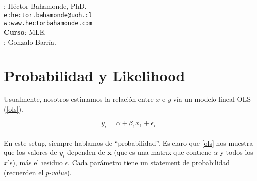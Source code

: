 \documentclass[10pt]{article}
\begin{document}


\thispagestyle{fancy} %





\hspace{-5mm}{\bf Profesor}: H\'ector Bahamonde, PhD.\\
\texttt{e:}\href{mailto:hector.bahamonde@uoh.cl}{\texttt{hector.bahamonde@uoh.cl}}\\
\texttt{w:}\href{http://www.hectorbahamonde.com}{\texttt{www.hectorbahamonde.com}}\\
{\bf Curso}: MLE.\\
\hspace{-5mm}{\bf TA}: Gonzalo Barr\'ia.


\section*{Probabilidad y Likelihood}

Usualmente, nosotros estimamos la relaci\'on entre $x$ e $y$ v\'ia un modelo lineal OLS (\autoref{ols}).

\begin{equation}\label{ols}
y_{i} = \alpha + \beta_{1}x_{1} + \epsilon_{i}
\end{equation}

\paragraph{} En este setup, siempre hablamos de ``probabilidad''. Es claro que \autoref{ols} nos muestra que los valores de $y_{i}$ dependen de $\bm{x}$ (que es una matrix que contiene $\alpha$ y todos los $x$'s), m\'as el residuo $\epsilon$. Cada par\'ametro tiene un statement de probabilidad (recuerden el \emph{p-value}). 
\end{document}
